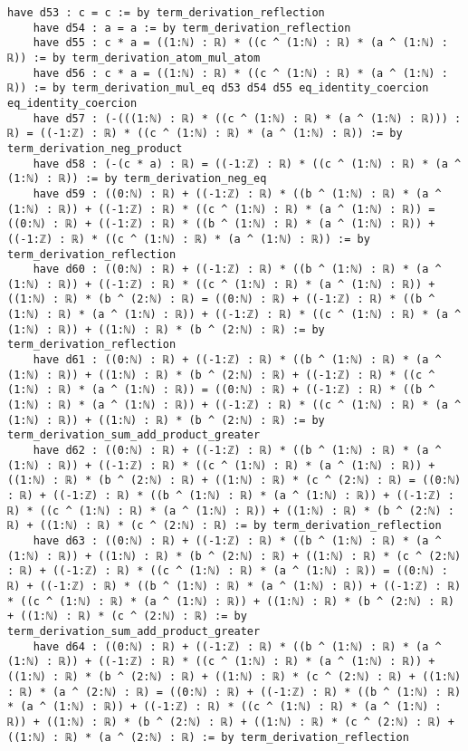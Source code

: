 \documentclass{article}
\begin{document}
\begin{tcolorbox}[colback=white!10, width=\linewidth]
\begin{lstlisting}[language=Lean4]
    have d53 : c = c := by term_derivation_reflection
    have d54 : a = a := by term_derivation_reflection
    have d55 : c * a = ((1:ℕ) : ℝ) * ((c ^ (1:ℕ) : ℝ) * (a ^ (1:ℕ) : ℝ)) := by term_derivation_atom_mul_atom
    have d56 : c * a = ((1:ℕ) : ℝ) * ((c ^ (1:ℕ) : ℝ) * (a ^ (1:ℕ) : ℝ)) := by term_derivation_mul_eq d53 d54 d55 eq_identity_coercion eq_identity_coercion
    have d57 : (-(((1:ℕ) : ℝ) * ((c ^ (1:ℕ) : ℝ) * (a ^ (1:ℕ) : ℝ))) : ℝ) = ((-1:ℤ) : ℝ) * ((c ^ (1:ℕ) : ℝ) * (a ^ (1:ℕ) : ℝ)) := by term_derivation_neg_product
    have d58 : (-(c * a) : ℝ) = ((-1:ℤ) : ℝ) * ((c ^ (1:ℕ) : ℝ) * (a ^ (1:ℕ) : ℝ)) := by term_derivation_neg_eq
    have d59 : ((0:ℕ) : ℝ) + ((-1:ℤ) : ℝ) * ((b ^ (1:ℕ) : ℝ) * (a ^ (1:ℕ) : ℝ)) + ((-1:ℤ) : ℝ) * ((c ^ (1:ℕ) : ℝ) * (a ^ (1:ℕ) : ℝ)) = ((0:ℕ) : ℝ) + ((-1:ℤ) : ℝ) * ((b ^ (1:ℕ) : ℝ) * (a ^ (1:ℕ) : ℝ)) + ((-1:ℤ) : ℝ) * ((c ^ (1:ℕ) : ℝ) * (a ^ (1:ℕ) : ℝ)) := by term_derivation_reflection
    have d60 : ((0:ℕ) : ℝ) + ((-1:ℤ) : ℝ) * ((b ^ (1:ℕ) : ℝ) * (a ^ (1:ℕ) : ℝ)) + ((-1:ℤ) : ℝ) * ((c ^ (1:ℕ) : ℝ) * (a ^ (1:ℕ) : ℝ)) + ((1:ℕ) : ℝ) * (b ^ (2:ℕ) : ℝ) = ((0:ℕ) : ℝ) + ((-1:ℤ) : ℝ) * ((b ^ (1:ℕ) : ℝ) * (a ^ (1:ℕ) : ℝ)) + ((-1:ℤ) : ℝ) * ((c ^ (1:ℕ) : ℝ) * (a ^ (1:ℕ) : ℝ)) + ((1:ℕ) : ℝ) * (b ^ (2:ℕ) : ℝ) := by term_derivation_reflection
    have d61 : ((0:ℕ) : ℝ) + ((-1:ℤ) : ℝ) * ((b ^ (1:ℕ) : ℝ) * (a ^ (1:ℕ) : ℝ)) + ((1:ℕ) : ℝ) * (b ^ (2:ℕ) : ℝ) + ((-1:ℤ) : ℝ) * ((c ^ (1:ℕ) : ℝ) * (a ^ (1:ℕ) : ℝ)) = ((0:ℕ) : ℝ) + ((-1:ℤ) : ℝ) * ((b ^ (1:ℕ) : ℝ) * (a ^ (1:ℕ) : ℝ)) + ((-1:ℤ) : ℝ) * ((c ^ (1:ℕ) : ℝ) * (a ^ (1:ℕ) : ℝ)) + ((1:ℕ) : ℝ) * (b ^ (2:ℕ) : ℝ) := by term_derivation_sum_add_product_greater
    have d62 : ((0:ℕ) : ℝ) + ((-1:ℤ) : ℝ) * ((b ^ (1:ℕ) : ℝ) * (a ^ (1:ℕ) : ℝ)) + ((-1:ℤ) : ℝ) * ((c ^ (1:ℕ) : ℝ) * (a ^ (1:ℕ) : ℝ)) + ((1:ℕ) : ℝ) * (b ^ (2:ℕ) : ℝ) + ((1:ℕ) : ℝ) * (c ^ (2:ℕ) : ℝ) = ((0:ℕ) : ℝ) + ((-1:ℤ) : ℝ) * ((b ^ (1:ℕ) : ℝ) * (a ^ (1:ℕ) : ℝ)) + ((-1:ℤ) : ℝ) * ((c ^ (1:ℕ) : ℝ) * (a ^ (1:ℕ) : ℝ)) + ((1:ℕ) : ℝ) * (b ^ (2:ℕ) : ℝ) + ((1:ℕ) : ℝ) * (c ^ (2:ℕ) : ℝ) := by term_derivation_reflection
    have d63 : ((0:ℕ) : ℝ) + ((-1:ℤ) : ℝ) * ((b ^ (1:ℕ) : ℝ) * (a ^ (1:ℕ) : ℝ)) + ((1:ℕ) : ℝ) * (b ^ (2:ℕ) : ℝ) + ((1:ℕ) : ℝ) * (c ^ (2:ℕ) : ℝ) + ((-1:ℤ) : ℝ) * ((c ^ (1:ℕ) : ℝ) * (a ^ (1:ℕ) : ℝ)) = ((0:ℕ) : ℝ) + ((-1:ℤ) : ℝ) * ((b ^ (1:ℕ) : ℝ) * (a ^ (1:ℕ) : ℝ)) + ((-1:ℤ) : ℝ) * ((c ^ (1:ℕ) : ℝ) * (a ^ (1:ℕ) : ℝ)) + ((1:ℕ) : ℝ) * (b ^ (2:ℕ) : ℝ) + ((1:ℕ) : ℝ) * (c ^ (2:ℕ) : ℝ) := by term_derivation_sum_add_product_greater
    have d64 : ((0:ℕ) : ℝ) + ((-1:ℤ) : ℝ) * ((b ^ (1:ℕ) : ℝ) * (a ^ (1:ℕ) : ℝ)) + ((-1:ℤ) : ℝ) * ((c ^ (1:ℕ) : ℝ) * (a ^ (1:ℕ) : ℝ)) + ((1:ℕ) : ℝ) * (b ^ (2:ℕ) : ℝ) + ((1:ℕ) : ℝ) * (c ^ (2:ℕ) : ℝ) + ((1:ℕ) : ℝ) * (a ^ (2:ℕ) : ℝ) = ((0:ℕ) : ℝ) + ((-1:ℤ) : ℝ) * ((b ^ (1:ℕ) : ℝ) * (a ^ (1:ℕ) : ℝ)) + ((-1:ℤ) : ℝ) * ((c ^ (1:ℕ) : ℝ) * (a ^ (1:ℕ) : ℝ)) + ((1:ℕ) : ℝ) * (b ^ (2:ℕ) : ℝ) + ((1:ℕ) : ℝ) * (c ^ (2:ℕ) : ℝ) + ((1:ℕ) : ℝ) * (a ^ (2:ℕ) : ℝ) := by term_derivation_reflection

\end{lstlisting}
\end{tcolorbox}
\end{document}
